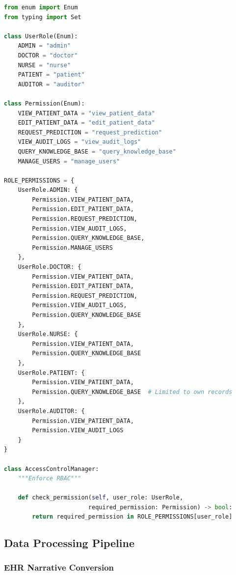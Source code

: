 \documentclass[12pt,singleside,a4paper]{article}
\begin{document}
\begin{lstlisting}[caption=RBAC Implementation,language=Python]
from enum import Enum
from typing import Set

class UserRole(Enum):
    ADMIN = "admin"
    DOCTOR = "doctor"
    NURSE = "nurse"
    PATIENT = "patient"
    AUDITOR = "auditor"

class Permission(Enum):
    VIEW_PATIENT_DATA = "view_patient_data"
    EDIT_PATIENT_DATA = "edit_patient_data"
    REQUEST_PREDICTION = "request_prediction"
    VIEW_AUDIT_LOGS = "view_audit_logs"
    QUERY_KNOWLEDGE_BASE = "query_knowledge_base"
    MANAGE_USERS = "manage_users"

ROLE_PERMISSIONS = {
    UserRole.ADMIN: {
        Permission.VIEW_PATIENT_DATA,
        Permission.EDIT_PATIENT_DATA,
        Permission.REQUEST_PREDICTION,
        Permission.VIEW_AUDIT_LOGS,
        Permission.QUERY_KNOWLEDGE_BASE,
        Permission.MANAGE_USERS
    },
    UserRole.DOCTOR: {
        Permission.VIEW_PATIENT_DATA,
        Permission.EDIT_PATIENT_DATA,
        Permission.REQUEST_PREDICTION,
        Permission.VIEW_AUDIT_LOGS,
        Permission.QUERY_KNOWLEDGE_BASE
    },
    UserRole.NURSE: {
        Permission.VIEW_PATIENT_DATA,
        Permission.QUERY_KNOWLEDGE_BASE
    },
    UserRole.PATIENT: {
        Permission.VIEW_PATIENT_DATA,
        Permission.QUERY_KNOWLEDGE_BASE  # Limited to own records
    },
    UserRole.AUDITOR: {
        Permission.VIEW_PATIENT_DATA,
        Permission.VIEW_AUDIT_LOGS
    }
}

class AccessControlManager:
    """Enforce RBAC"""
    
    def check_permission(self, user_role: UserRole, 
                        required_permission: Permission) -> bool:
        return required_permission in ROLE_PERMISSIONS[user_role]
\end{lstlisting}

\subsection{Data Processing Pipeline}

\subsubsection{EHR Narrative Conversion}
\end{document}
